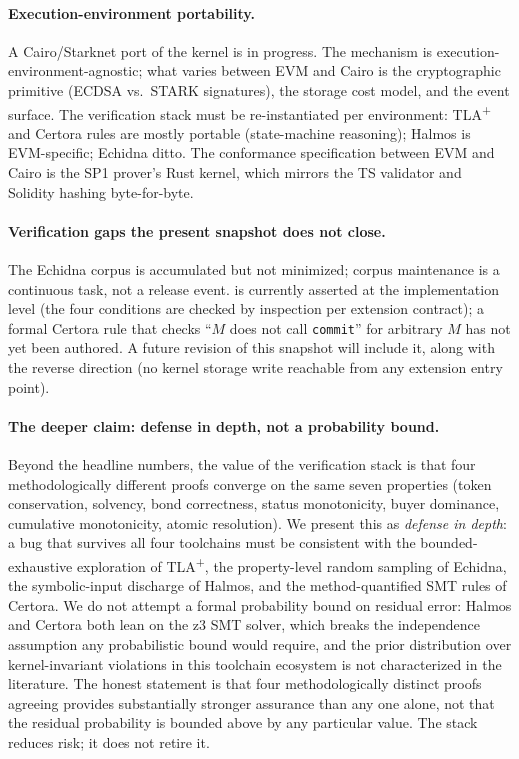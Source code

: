 \documentclass[11pt,a4paper]{article}
\theoremstyle{definition}
\theoremstyle{remark}
\begin{document}
\paragraph{Execution-environment portability.}
A Cairo/Starknet port of the kernel is in progress. The mechanism is
execution-environment-agnostic; what varies between EVM and Cairo is
the cryptographic primitive (ECDSA vs.\ STARK signatures), the
storage cost model, and the event surface. The verification stack
must be re-instantiated per environment: TLA\textsuperscript{+} and
Certora rules are mostly portable (state-machine reasoning); Halmos
is EVM-specific; Echidna ditto. The conformance specification
between EVM and Cairo is the SP1 prover's Rust kernel, which mirrors
the TS validator and Solidity hashing byte-for-byte.

\paragraph{Verification gaps the present snapshot does not close.}
The Echidna corpus is accumulated but not minimized; corpus
maintenance is a continuous task, not a release event.
 is currently asserted at the implementation
level (the four conditions are checked by inspection per extension
contract); a formal Certora rule that checks
``$M$ does not call \texttt{commit}'' for arbitrary $M$ has not yet
been authored. A future revision of this snapshot will include it,
along with the reverse direction (no kernel storage write reachable
from any extension entry point).

\paragraph{The deeper claim: defense in depth, not a probability bound.}
Beyond the headline numbers, the value of the verification stack
is that four methodologically different proofs converge on the
same seven properties (token conservation, solvency, bond
correctness, status monotonicity, buyer dominance, cumulative
monotonicity, atomic resolution). We present this as
\emph{defense in depth}: a bug that survives all four toolchains
must be consistent with the bounded-exhaustive exploration of
TLA\textsuperscript{+}, the property-level random sampling of
Echidna, the symbolic-input discharge of Halmos, and the
method-quantified SMT rules of Certora. We do not attempt a
formal probability bound on residual error: Halmos and Certora
both lean on the z3 SMT solver, which breaks the independence
assumption any probabilistic bound would require, and the prior
distribution over kernel-invariant violations in this toolchain
ecosystem is not characterized in the literature. The honest
statement is that four methodologically distinct proofs agreeing
provides substantially stronger assurance than any one alone, not
that the residual probability is bounded above by any particular
value. The stack reduces risk; it does not retire it.
\end{document}

